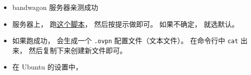 
\begin{issues}
\issueDraft
\end{issues}

\begin{itemize}
\item bandwagon 服务器亲测成功
\item 服务器上， 跑\href{https://github.com/MacroUniverse/openvpn-install/blob/master/openvpn-install.sh}{这个脚本}， 然后按提示做即可。 如果不确定， 就选默认。
\item 如果跑成功， 会生成一个 \verb|.ovpn| 配置文件（文本文件）。 在命令行中 \verb|cat| 出来， 然后复制下来创建新文件即可。
\item 在 Ubuntu 的设置中， 
\end{itemize}

